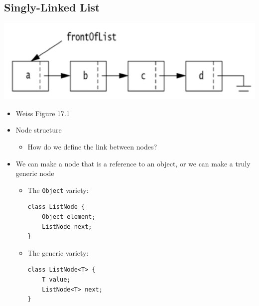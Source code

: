 \documentclass[10pt]{article}
\begin{document}
\subsection*{Singly-Linked List}
\begin{center}
\includegraphics[width=\textwidth/4]{images/1.png}
\end{center}
\begin{itemize}
    \item Weiss Figure 17.1
    \item Node structure
    \begin{itemize}
        \item How do we define the link between nodes?
    \end{itemize}
    \item We can make a node that is a reference to an object, or we can make a truly generic node
    \begin{itemize}
        \item The \texttt{Object} variety:
        \begin{verbatim}
class ListNode {
    Object element;
    ListNode next;
}
        \end{verbatim}
        \item The generic variety:
        \begin{verbatim}
class ListNode<T> {
    T value;
    ListNode<T> next;
}
        \end{verbatim}
    \end{itemize}
\end{itemize}
\end{document}
